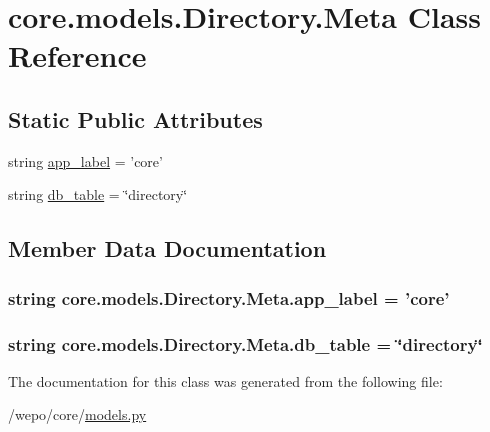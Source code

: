 \hypertarget{classcore_1_1models_1_1Directory_1_1Meta}{\section{core.\-models.\-Directory.\-Meta Class Reference}
\label{classcore_1_1models_1_1Directory_1_1Meta}
}
\subsection*{Static Public Attributes}
\begin{DoxyCompactItemize}
\item 
string \hyperlink{classcore_1_1models_1_1Directory_1_1Meta_a3d8f50ba4d90c686c0889bd46ead8851}{app\-\_\-label} = 'core'
\item 
string \hyperlink{classcore_1_1models_1_1Directory_1_1Meta_a1bf87f154027192d39396de8fc4150e6}{db\-\_\-table} = \char`\"{}directory\char`\"{}
\end{DoxyCompactItemize}


\subsection{Member Data Documentation}
\hypertarget{classcore_1_1models_1_1Directory_1_1Meta_a3d8f50ba4d90c686c0889bd46ead8851}{
\subsubsection[{app\-\_\-label}]{\setlength{\rightskip}{0pt plus 5cm}string core.\-models.\-Directory.\-Meta.\-app\-\_\-label = 'core'\hspace{0.3cm}{\ttfamily [static]}}}\label{classcore_1_1models_1_1Directory_1_1Meta_a3d8f50ba4d90c686c0889bd46ead8851}
\hypertarget{classcore_1_1models_1_1Directory_1_1Meta_a1bf87f154027192d39396de8fc4150e6}{
\subsubsection[{db\-\_\-table}]{\setlength{\rightskip}{0pt plus 5cm}string core.\-models.\-Directory.\-Meta.\-db\-\_\-table = \char`\"{}directory\char`\"{}\hspace{0.3cm}{\ttfamily [static]}}}\label{classcore_1_1models_1_1Directory_1_1Meta_a1bf87f154027192d39396de8fc4150e6}


The documentation for this class was generated from the following file\-:\begin{DoxyCompactItemize}
\item 
/wepo/core/\hyperlink{models_8py}{models.\-py}\end{DoxyCompactItemize}
